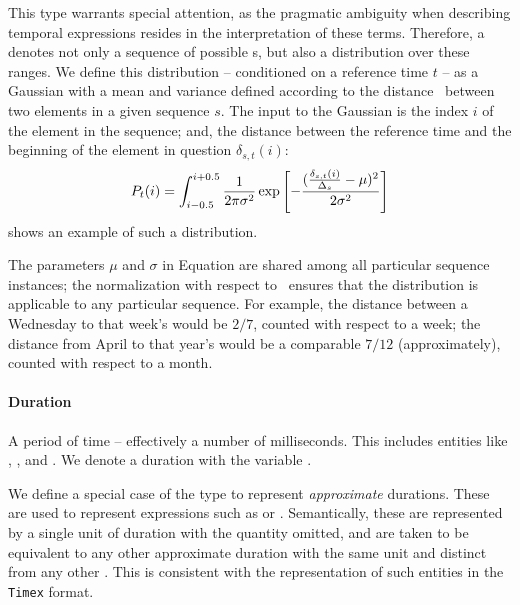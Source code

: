 This type warrants special attention, as the pragmatic ambiguity when
	describing temporal expressions resides in the interpretation of these
	terms.
Therefore, a  denotes not only a sequence of possible
	s, but also a distribution over these ranges.
We define this distribution -- conditioned on a reference time $t$ --
	as a Gaussian with a mean and variance defined according
	to the distance \seqjump\ between two elements in a given sequence $s$.
The input to the Gaussian is the index $i$ of the element in the sequence;
	and, the distance between the reference time and the beginning
	of the element in question $\delta_{s,t}(i)$:
\begin{equation}
\label{eqn:gaussian}
	P_t(i) = 
	\int_{i-0.5}^{i+0.5}
		\frac{1}{2\pi\sigma^2} 
			\exp\left[-\frac{
					(\frac{\delta_{s,t}(i)}{\Delta_s} - \mu)^2
				}{
					2\sigma^2
				}
			\right]
\end{equation}
\needfig shows an example of such a distribution.

The parameters $\mu$ and $\sigma$ in Equation  are shared
	among all particular sequence instances; the normalization
	with respect to \seqjump\ ensures that the distribution is applicable
	to any particular sequence.
For example, the distance between a Wednesday to that week's 
	would be $2/7$, counted with respect to a week; 
	the distance from April to that year's  would be a 
	comparable $7/12$ (approximately), counted with respect to a month.
	
\paragraph{Duration}
A period of time -- effectively a number of milliseconds.
This includes entities like , , and .
We denote a duration with the variable \dur.

We define a special case of the  type to represent 
	\textit{approximate} durations.
These are used to represent expressions such as  or
	.
Semantically, these are represented by a single unit of duration with the
	quantity omitted, and are taken to be equivalent to any other approximate
	duration with the same unit and distinct from any other .
This is consistent with the representation of such entities in the
	\texttt{Timex} format.

